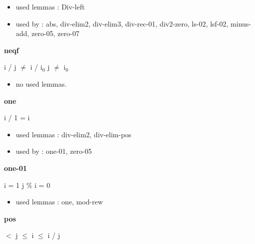 \documentclass[a4paper]{article}
\begin{document}
\begin{itemize}


\item       used lemmas  : Div-left
\item       used by      : abs, div-elim2, div-elim3, div-rec-01, div2-zero, ls-02, lsf-02, minus-add, zero-05, zero-07

\end{itemize}

\medskip

\bigskip

{\large\bf neqf}

\medskip

 \Fol i / j $\neq$ i / $\mbox{i}_{0}$ \Imp j $\neq$ $\mbox{i}_{0}$

\begin{itemize}


\item       no used lemmas.

\end{itemize}

\medskip

\bigskip

{\large\bf one}

\medskip

 \Fol i / 1 = i

\begin{itemize}


\item       used lemmas  : div-elim2, div-elim-pos
\item       used by      : one-01, zero-05

\end{itemize}

\medskip

\bigskip

{\large\bf one-01}

\medskip

 \Fol i = 1 \Imp j \% i = 0

\begin{itemize}


\item       used lemmas  : one, mod-rew

\end{itemize}

\medskip

\bigskip

{\large\bf pos}

\medskip

  $<$ j  $\le$ i  $\le$ i / j
\end{document}
